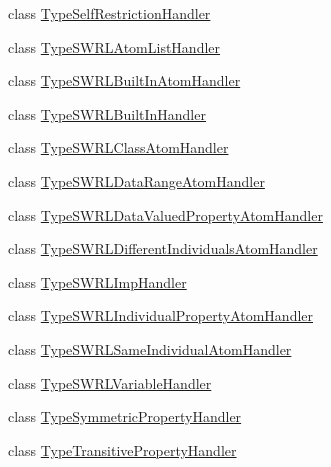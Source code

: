 \begin{DoxyCompactItemize}
\item 
class \hyperlink{classorg_1_1coode_1_1owlapi_1_1rdfxml_1_1parser_1_1_type_self_restriction_handler}{Type\-Self\-Restriction\-Handler}
\item 
class \hyperlink{classorg_1_1coode_1_1owlapi_1_1rdfxml_1_1parser_1_1_type_s_w_r_l_atom_list_handler}{Type\-S\-W\-R\-L\-Atom\-List\-Handler}
\item 
class \hyperlink{classorg_1_1coode_1_1owlapi_1_1rdfxml_1_1parser_1_1_type_s_w_r_l_built_in_atom_handler}{Type\-S\-W\-R\-L\-Built\-In\-Atom\-Handler}
\item 
class \hyperlink{classorg_1_1coode_1_1owlapi_1_1rdfxml_1_1parser_1_1_type_s_w_r_l_built_in_handler}{Type\-S\-W\-R\-L\-Built\-In\-Handler}
\item 
class \hyperlink{classorg_1_1coode_1_1owlapi_1_1rdfxml_1_1parser_1_1_type_s_w_r_l_class_atom_handler}{Type\-S\-W\-R\-L\-Class\-Atom\-Handler}
\item 
class \hyperlink{classorg_1_1coode_1_1owlapi_1_1rdfxml_1_1parser_1_1_type_s_w_r_l_data_range_atom_handler}{Type\-S\-W\-R\-L\-Data\-Range\-Atom\-Handler}
\item 
class \hyperlink{classorg_1_1coode_1_1owlapi_1_1rdfxml_1_1parser_1_1_type_s_w_r_l_data_valued_property_atom_handler}{Type\-S\-W\-R\-L\-Data\-Valued\-Property\-Atom\-Handler}
\item 
class \hyperlink{classorg_1_1coode_1_1owlapi_1_1rdfxml_1_1parser_1_1_type_s_w_r_l_different_individuals_atom_handler}{Type\-S\-W\-R\-L\-Different\-Individuals\-Atom\-Handler}
\item 
class \hyperlink{classorg_1_1coode_1_1owlapi_1_1rdfxml_1_1parser_1_1_type_s_w_r_l_imp_handler}{Type\-S\-W\-R\-L\-Imp\-Handler}
\item 
class \hyperlink{classorg_1_1coode_1_1owlapi_1_1rdfxml_1_1parser_1_1_type_s_w_r_l_individual_property_atom_handler}{Type\-S\-W\-R\-L\-Individual\-Property\-Atom\-Handler}
\item 
class \hyperlink{classorg_1_1coode_1_1owlapi_1_1rdfxml_1_1parser_1_1_type_s_w_r_l_same_individual_atom_handler}{Type\-S\-W\-R\-L\-Same\-Individual\-Atom\-Handler}
\item 
class \hyperlink{classorg_1_1coode_1_1owlapi_1_1rdfxml_1_1parser_1_1_type_s_w_r_l_variable_handler}{Type\-S\-W\-R\-L\-Variable\-Handler}
\item 
class \hyperlink{classorg_1_1coode_1_1owlapi_1_1rdfxml_1_1parser_1_1_type_symmetric_property_handler}{Type\-Symmetric\-Property\-Handler}
\item 
class \hyperlink{classorg_1_1coode_1_1owlapi_1_1rdfxml_1_1parser_1_1_type_transitive_property_handler}{Type\-Transitive\-Property\-Handler}
\end{DoxyCompactItemize}
